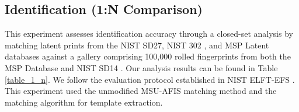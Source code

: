 \documentclass[twocolumn, switch]{article} %
\begin{document}
\begin{table}[h]
\centering
{}
\caption{Mean, standard deviation, and skewness of NFIQ 2 scores before and after enhancement.}
\label{nfiq2table}
\end{table}



\subsection{Identification (1:N Comparison)}

This experiment assesses identification accuracy through a closed-set analysis by matching latent prints from the NIST SD27, NIST 302 \cite{fiumara2019nist}, and MSP Latent databases against a gallery comprising 100,000 rolled fingerprints from both the MSP Database and NIST SD14 \cite{watson2001nist}. Our analysis results can be found in Table \ref{table_1_n}. We follow the evaluation protocol established in NIST ELFT-EFS \cite{flanagan2010nist}. This experiment used the unmodified MSU-AFIS matching method and the matching algorithm for template extraction.
\end{document}
